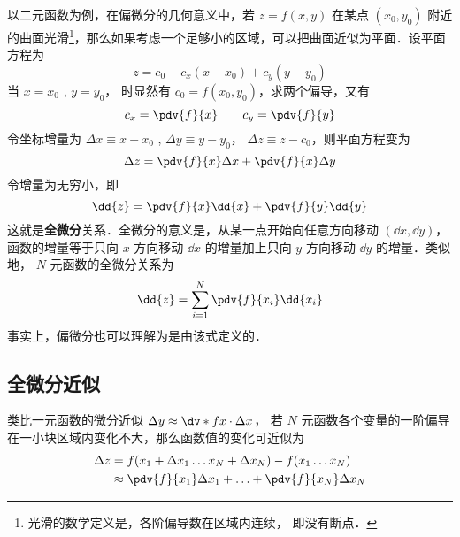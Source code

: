 

以二元函数为例，在偏微分的几何意义中，若 $z = f(x,y)$ 在某点 $({x_0},{y_0})$ 附近的曲面光滑\footnote{光滑的数学定义是，各阶偏导数在区域内连续， 即没有断点．}，那么如果考虑一个足够小的区域，可以把曲面近似为平面．设平面方程为
\begin{equation}
z = {c_0} + {c_x}(x - {x_0}) + {c_y}(y - {y_0})
\end{equation}
当 $x=x_0$ , $y=y_0$， 时显然有 ${c_0} = f({x_0},{y_0})$，求两个偏导，又有
\begin{equation}
{c_x} = \pdv{f}{x} \qquad {c_y} = \pdv{f}{y}
\end{equation}
令坐标增量为 $\Delta x \equiv x - {x_0}$ , $\Delta y \equiv y - {y_0}$，  $\Delta z \equiv z - {c_0}$，则平面方程变为
\begin{equation}
\Delta z = \pdv{f}{x}\Delta x + \pdv{f}{x}\Delta y
\end{equation}
令增量为无穷小，即
 \begin{equation}
\dd{z} = \pdv{f}{x} \dd{x} + \pdv{f}{y} \dd{y}
\end{equation}
这就是\textbf{全微分}关系．全微分的意义是，从某一点开始向任意方向移动 $(\dd{x}, \dd{y})$，函数的增量等于只向 $x$ 方向移动 $\dd{x}$ 的增量加上只向 $y$ 方向移动 $\dd{y}$ 的增量．类似地， $N$ 元函数的全微分关系为
\begin{equation}
\dd{z} = \sum_{i = 1}^{N}\pdv{f}{x_i} \dd{x_i}
\end{equation}
事实上，偏微分也可以理解为是由该式定义的．

\subsection{全微分近似}
类比一元函数的微分近似 $\Delta y \approx \dv*{f}{x}\cdot \Delta x$， 若 $N$ 元函数各个变量的一阶偏导在一小块区域内变化不大，那么函数值的变化可近似为
\begin{equation}\label{TDiff_eq6}
\begin{aligned}
\Delta z &= f(x_1+\Delta x_1\ldots x_N + \Delta x_N) - f(x_1\ldots x_N) \\
&\approx \pdv{f}{x_1}\Delta {x_1} +\ldots + \pdv{f}{x_N}\Delta {x_N}
\end{aligned}\end{equation}

